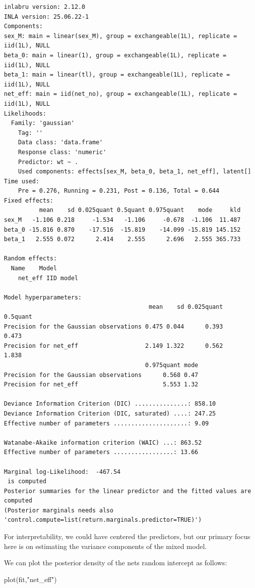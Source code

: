 \documentclass[
  letterpaper,
  DIV=11,
  numbers=noendperiod]{scrartcl}
\newenvironment{Shaded}{\begin{snugshade}}{\end{snugshade}}
\newcommand{\FunctionTok}[1]{\textcolor[rgb]{0.28,0.35,0.67}{#1}}
\newcommand{\NormalTok}[1]{\textcolor[rgb]{0.00,0.23,0.31}{#1}}
\newcommand{\StringTok}[1]{\textcolor[rgb]{0.13,0.47,0.30}{#1}}
\begin{document}
\begin{verbatim}
inlabru version: 2.12.0
INLA version: 25.06.22-1
Components:
sex_M: main = linear(sex_M), group = exchangeable(1L), replicate = iid(1L), NULL
beta_0: main = linear(1), group = exchangeable(1L), replicate = iid(1L), NULL
beta_1: main = linear(tl), group = exchangeable(1L), replicate = iid(1L), NULL
net_eff: main = iid(net_no), group = exchangeable(1L), replicate = iid(1L), NULL
Likelihoods:
  Family: 'gaussian'
    Tag: ''
    Data class: 'data.frame'
    Response class: 'numeric'
    Predictor: wt ~ .
    Used components: effects[sex_M, beta_0, beta_1, net_eff], latent[]
Time used:
    Pre = 0.276, Running = 0.231, Post = 0.136, Total = 0.644 
Fixed effects:
          mean    sd 0.025quant 0.5quant 0.975quant    mode     kld
sex_M   -1.106 0.218     -1.534   -1.106     -0.678  -1.106  11.487
beta_0 -15.816 0.870    -17.516  -15.819    -14.099 -15.819 145.152
beta_1   2.555 0.072      2.414    2.555      2.696   2.555 365.733

Random effects:
  Name    Model
    net_eff IID model

Model hyperparameters:
                                         mean    sd 0.025quant 0.5quant
Precision for the Gaussian observations 0.475 0.044      0.393    0.473
Precision for net_eff                   2.149 1.322      0.562    1.838
                                        0.975quant mode
Precision for the Gaussian observations      0.568 0.47
Precision for net_eff                        5.553 1.32

Deviance Information Criterion (DIC) ...............: 858.10
Deviance Information Criterion (DIC, saturated) ....: 247.25
Effective number of parameters .....................: 9.09

Watanabe-Akaike information criterion (WAIC) ...: 863.52
Effective number of parameters .................: 13.66

Marginal log-Likelihood:  -467.54 
 is computed 
Posterior summaries for the linear predictor and the fitted values are computed
(Posterior marginals needs also 'control.compute=list(return.marginals.predictor=TRUE)')
\end{verbatim}

For interpretability, we could have centered the predictors, but our
primary focus here is on estimating the variance components of the mixed
model.

We can plot the posterior density of the nets random intercept as
follows:

\begin{Shaded}
\begin{Highlighting}[]
\FunctionTok{plot}\NormalTok{(fit,}\StringTok{"net\_eff"}\NormalTok{)}
\end{Highlighting}
\end{Shaded}
\end{document}
